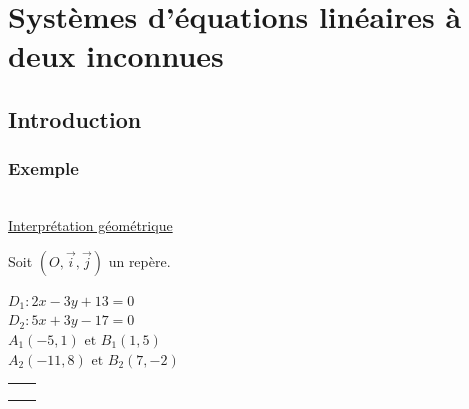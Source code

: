 \ifdefined\COMPLETE
\else
    
    
\fi

\vspace*{-2.5cm}

\section{Systèmes d'équations linéaires à deux inconnues}

\subsection{Introduction}

\subsubsection{Exemple }

\\

\underline{Interprétation géométrique}

Soit $(O, \vec{i}, \vec{j})$ un repère. 

$D_1 : 2x -3y +13 = 0$\\

$D_2 : 5x +3y -17 = 0$\\

$A_1 (-5, 1) \textrm { et } B_1(1,5)$ \\

$A_2 (-11, 8) \textrm { et } B_2(7,-2)$ \\

\begin{tabular}{ll}
\begin{minipage}{5cm}
$D_1$ :  \raisebox{-2ex}{$\quad \begin{cases}
               3y \!\!\!\!\!\!\!\!&= -2x +13\\
                \;\;y\!\!\!\!\!\!\!\!&= \dfrac{2x}{3} +\dfrac{13}{3}\\
                        \end{cases}$ }\\
\end{minipage}  & 
                   \begin{minipage}{5cm}
                  $D_2$ :   \raisebox{-2ex}{$\quad \begin{cases}
                                           9y \!\!\!\!\!\!\!\!&= -5x +17\\
                                            \;\;y\!\!\!\!\!\!\!\!&= \dfrac{-5}{9}x +\dfrac{17}{9}\\
                        \end{cases}$ }\\
\end{minipage}\\
\end{tabular}\\

